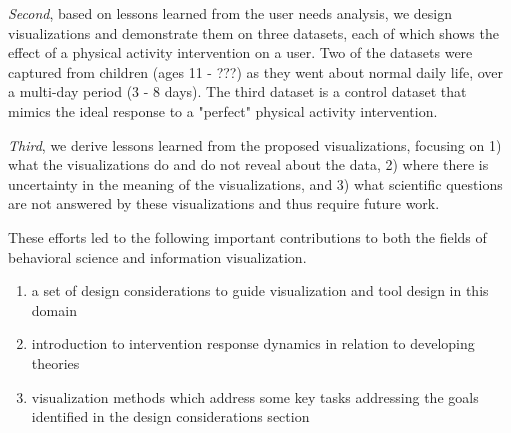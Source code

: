 \textit{Second}, based on lessons learned from the user needs analysis, we design visualizations and demonstrate them on three datasets, each of which shows the effect of a physical activity intervention on a user. Two of the datasets were captured from children (ages 11 - ???) as they went about normal daily life, over a multi-day period (3 - 8 days).  The third dataset is a control dataset that mimics the ideal response to a "perfect" physical activity intervention.

\textit{Third}, we derive lessons learned from the proposed visualizations, focusing on 1) what the visualizations do and do not reveal about the data, 2) where there is uncertainty in the meaning of the visualizations, and 3) what scientific questions are not answered by these visualizations and thus require future work.

These efforts led to the following important contributions to both the fields of behavioral science and information visualization.

\begin{enumerate}
	\item{a set of design considerations to guide visualization and tool design in this domain}
	\item{introduction to intervention response dynamics in relation to developing theories}
	\item{visualization methods which address some key tasks addressing the goals identified in the design considerations section}
\end{enumerate}



